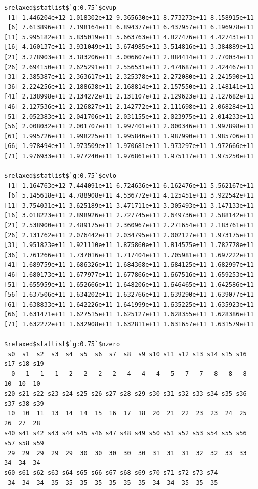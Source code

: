 \documentclass[
]{article}
\begin{document}
\begin{verbatim}
$relaxed$statlist$`g:0.75`$cvup
 [1] 1.446204e+12 1.018302e+12 9.365630e+11 8.773273e+11 8.158915e+11
 [6] 7.613896e+11 7.198164e+11 6.894377e+11 6.437957e+11 6.196978e+11
[11] 5.995182e+11 5.835019e+11 5.663763e+11 4.827476e+11 4.427431e+11
[16] 4.160137e+11 3.931049e+11 3.674985e+11 3.514816e+11 3.384889e+11
[21] 3.278903e+11 3.183206e+11 3.006607e+11 2.884414e+11 2.770034e+11
[26] 2.694150e+11 2.625291e+11 2.556531e+11 2.474687e+11 2.424467e+11
[31] 2.385387e+11 2.363617e+11 2.325378e+11 2.272080e+11 2.241590e+11
[36] 2.224256e+11 2.188638e+11 2.168814e+11 2.157550e+11 2.148141e+11
[41] 2.138998e+11 2.134272e+11 2.131107e+11 2.129623e+11 2.127682e+11
[46] 2.127536e+11 2.126827e+11 2.142772e+11 2.111698e+11 2.068284e+11
[51] 2.052383e+11 2.041706e+11 2.031155e+11 2.023975e+11 2.014233e+11
[56] 2.008032e+11 2.001707e+11 1.997401e+11 2.000346e+11 1.997898e+11
[61] 1.995726e+11 1.998225e+11 1.995846e+11 1.987990e+11 1.985706e+11
[66] 1.978494e+11 1.973509e+11 1.970681e+11 1.973297e+11 1.972666e+11
[71] 1.976933e+11 1.977240e+11 1.976861e+11 1.975117e+11 1.975250e+11

$relaxed$statlist$`g:0.75`$cvlo
 [1] 1.164763e+12 7.444091e+11 6.724636e+11 6.162476e+11 5.562167e+11
 [6] 5.145618e+11 4.788908e+11 4.536772e+11 4.125451e+11 3.922542e+11
[11] 3.754031e+11 3.625189e+11 3.471711e+11 3.305493e+11 3.147133e+11
[16] 3.018223e+11 2.898926e+11 2.727745e+11 2.649736e+11 2.588142e+11
[21] 2.538900e+11 2.489175e+11 2.360967e+11 2.271654e+11 2.183761e+11
[26] 2.131762e+11 2.076442e+11 2.034795e+11 2.002127e+11 1.973175e+11
[31] 1.951823e+11 1.921110e+11 1.875860e+11 1.814575e+11 1.782778e+11
[36] 1.761266e+11 1.737016e+11 1.717404e+11 1.705981e+11 1.697222e+11
[41] 1.689759e+11 1.686326e+11 1.684368e+11 1.684125e+11 1.682997e+11
[46] 1.680173e+11 1.677977e+11 1.677866e+11 1.667516e+11 1.659253e+11
[51] 1.655959e+11 1.652666e+11 1.648206e+11 1.646465e+11 1.642586e+11
[56] 1.637506e+11 1.634202e+11 1.632766e+11 1.639290e+11 1.639077e+11
[61] 1.638833e+11 1.642226e+11 1.641999e+11 1.635225e+11 1.635923e+11
[66] 1.631471e+11 1.627515e+11 1.625127e+11 1.628355e+11 1.628386e+11
[71] 1.632272e+11 1.632908e+11 1.632811e+11 1.631657e+11 1.631579e+11

$relaxed$statlist$`g:0.75`$nzero
 s0  s1  s2  s3  s4  s5  s6  s7  s8  s9 s10 s11 s12 s13 s14 s15 s16 s17 s18 s19 
  0   1   1   1   2   2   2   2   4   4   4   5   7   7   8   8   8  10  10  10 
s20 s21 s22 s23 s24 s25 s26 s27 s28 s29 s30 s31 s32 s33 s34 s35 s36 s37 s38 s39 
 10  10  11  13  14  14  15  16  17  18  20  21  22  23  23  24  25  26  27  28 
s40 s41 s42 s43 s44 s45 s46 s47 s48 s49 s50 s51 s52 s53 s54 s55 s56 s57 s58 s59 
 29  29  29  29  29  30  30  30  30  30  31  31  31  32  32  33  33  34  34  34 
s60 s61 s62 s63 s64 s65 s66 s67 s68 s69 s70 s71 s72 s73 s74 
 34  34  34  35  35  35  35  35  35  35  34  34  35  35  35 



\end{verbatim}
\end{document}
